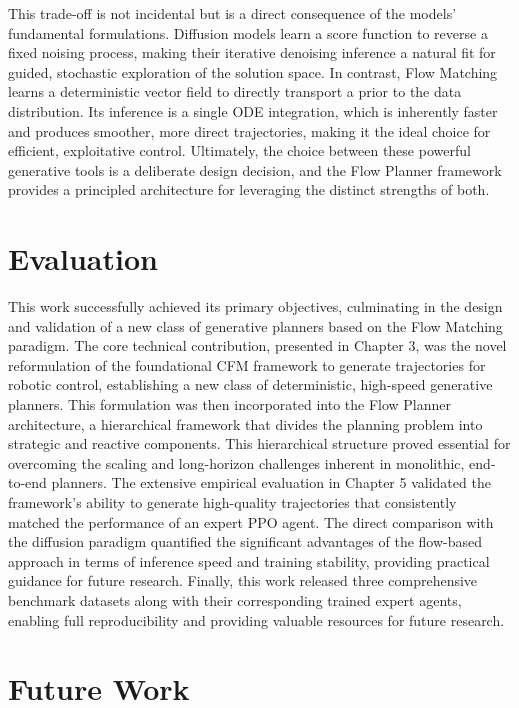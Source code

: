 This trade-off is not incidental but is a direct consequence of the models' fundamental formulations. Diffusion models learn a score function to reverse a fixed noising process, making their iterative denoising inference a natural fit for guided, stochastic exploration of the solution space. In contrast, Flow Matching learns a deterministic vector field to directly transport a prior to the data distribution. Its inference is a single ODE integration, which is inherently faster and produces smoother, more direct trajectories, making it the ideal choice for efficient, exploitative control. Ultimately, the choice between these powerful generative tools is a deliberate design decision, and the Flow Planner framework provides a principled architecture for leveraging the distinct strengths of both.


\section{Evaluation}
This work successfully achieved its primary objectives, culminating in the design and validation of a new class of generative planners based on the Flow Matching paradigm. The core technical contribution, presented in Chapter 3, was the novel reformulation of the foundational CFM framework to generate trajectories for robotic control, establishing a new class of deterministic, high-speed generative planners. This formulation was then incorporated into the Flow Planner architecture, a hierarchical framework that divides the planning problem into strategic and reactive components. This hierarchical structure proved essential for overcoming the scaling and long-horizon challenges inherent in monolithic, end-to-end planners.
The extensive empirical evaluation in Chapter 5 validated the framework's ability to generate high-quality trajectories that consistently matched the performance of an expert PPO agent. The direct comparison with the diffusion paradigm quantified the significant advantages of the flow-based approach in terms of inference speed and training stability, providing practical guidance for future research. Finally, this work released three comprehensive benchmark datasets along with their corresponding trained expert agents, enabling full reproducibility and providing valuable resources for future research.
\section{Future Work}
